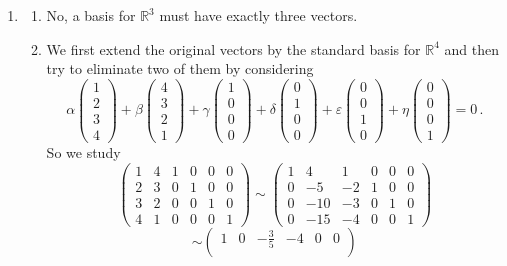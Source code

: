 \begin{enumerate}
\item \begin{enumerate}
\item No, a basis for  ${\mathbb R}^3$ must have exactly three vectors.
\item We first extend the original vectors by the standard basis for ${\mathbb R}^4$ and then try to eliminate two of them by considering
\[
\alpha \begin{pmatrix}1\\2\\3\\4\end{pmatrix}+\beta
\begin{pmatrix}4\\3\\2\\1\end{pmatrix} +\gamma 
\begin{pmatrix}1\\0\\0\\0\end{pmatrix}
+\delta\begin{pmatrix}0\\1\\0\\0\end{pmatrix}
+\varepsilon\begin{pmatrix}0\\0\\1\\0\end{pmatrix}
+\eta\begin{pmatrix}0\\0\\0\\1\end{pmatrix}=0\, .
\] 
So we study
\[
\begin{pmatrix}
1&4&1&0&0&0\\
2&3&0&1&0&0\\
3&2&0&0&1&0\\
4&1&0&0&0&1
\end{pmatrix}
\sim
\begin{pmatrix}
1&4&1&0&0&0\\
0&-5&-2&1&0&0\\
0&-10&-3&0&1&0\\
0&-15&-4&0&0&1
\end{pmatrix}
\]
\[
\sim
\begin{pmatrix}
1&0&-\frac35&-4&0&0\\

\end{pmatrix}\]
\end{enumerate}
\end{enumerate}
